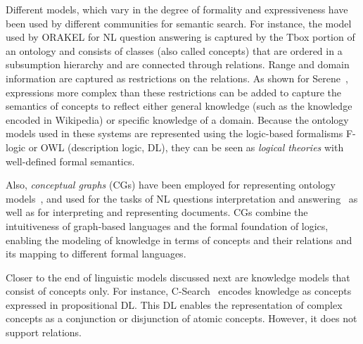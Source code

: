 Different models, which vary in the degree of formality and expressiveness have been used by different communities for semantic search. For instance, the model used by ORAKEL for NL question answering is captured by the Tbox portion of an ontology and consists of classes (also called concepts) that are ordered in a subsumption hierarchy and are connected through relations. Range and domain information are captured as restrictions on the relations. As shown for Serene~\cite{DBLP:journals/ws/FazzingaGGL11}, expressions more complex than these restrictions can be added to capture the semantics of concepts to reflect either general knowledge (such as the knowledge encoded in Wikipedia)
or specific knowledge of a domain. Because the ontology models used in these systems are represented using the logic-based formalisms F-logic or OWL (description logic, DL), they can be seen as \emph{logical theories} with well-defined formal semantics. 

Also, \emph{conceptual graphs} (CGs) have been employed for representing ontology models~\cite{DBLP:conf/ecai/CorbyDF04}, and used for the tasks of NL questions interpretation and answering~\cite{DBLP:conf/aswc/CaoCT08} as well as for interpreting and representing documents. CGs combine the intuitiveness of graph-based languages and the formal foundation of logics, enabling the modeling of knowledge in terms of concepts and their relations and its mapping to different formal languages. 

Closer to the end of linguistic models discussed next are knowledge models that consist of concepts only. For instance, C-Search~\cite{DBLP:conf/esws/GiunchigliaKZ09} encodes knowledge as concepts expressed in propositional DL. This DL enables the representation of complex concepts as a conjunction or disjunction of atomic concepts. However, it does not support relations. 

		
